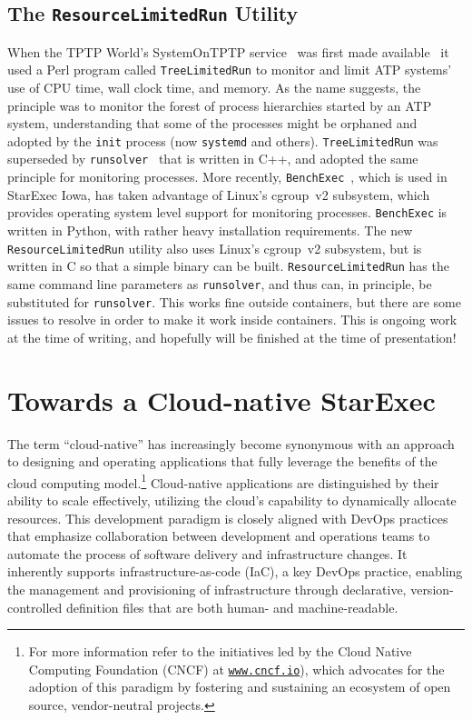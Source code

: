 \documentclass{easychair}
\begin{document}
\subsection{The {\tt ResourceLimitedRun} Utility}
\label{RLR}

When the TPTP World's SystemOnTPTP service~\cite{Sut00-CADE-17} was first made 
available~\cite{Sut07-CSR} it used a Perl program called {\tt TreeLimitedRun} to monitor and 
limit ATP systems' use of CPU time, wall clock time, and memory.
As the name suggests, the principle was to monitor the forest of process hierarchies started by
an ATP system, understanding that some of the processes might be orphaned and adopted by the
{\tt init} process (now {\tt systemd} and others).
{\tt TreeLimitedRun} was superseded by {\tt runsolver}~\cite{Rou11} that is written in C++, and
adopted the same principle for monitoring processes.
More recently, {\tt BenchExec}~\cite{BLW19}, which is used in StarExec Iowa, has taken advantage 
of Linux's cgroup~v2 subsystem, which provides operating system level support for monitoring 
processes.
{\tt BenchExec} is written in Python, with rather heavy installation requirements.
The new {\tt ResourceLimitedRun} utility also uses Linux's cgroup~v2 subsystem, but is written
in C so that a simple binary can be built.
{\tt ResourceLimitedRun} has the same command line parameters as {\tt runsolver}, and thus
can, in principle, be substituted for {\tt runsolver}.
This works fine outside containers, but there are some issues to resolve in order to make
it work inside containers.
This is ongoing work at the time of writing, and hopefully will be finished at the time of
presentation!

\section{Towards a Cloud-native StarExec}
\label{StarExecK}

The term ``cloud-native'' has increasingly become synonymous with an approach to designing and 
operating applications that fully leverage the benefits of the cloud computing model.\footnote{%
For more information refer to the initiatives led by the Cloud Native Computing Foundation (CNCF)
at \href{https://www.cncf.io/}{\tt www.cncf.io}), which advocates for the adoption of this paradigm
by fostering and sustaining an ecosystem of open source, vendor-neutral projects.}
Cloud-native applications are distinguished by their ability to scale effectively, utilizing 
the cloud's capability to dynamically allocate resources. 
This development paradigm is closely aligned with DevOps practices that emphasize collaboration 
between development and operations teams to automate the process of software delivery and 
infrastructure changes. 
It inherently supports infrastructure-as-code (IaC), a key DevOps practice, enabling the management 
and provisioning of infrastructure through declarative, version-controlled definition files that 
are both human- and machine-readable.
\end{document}
